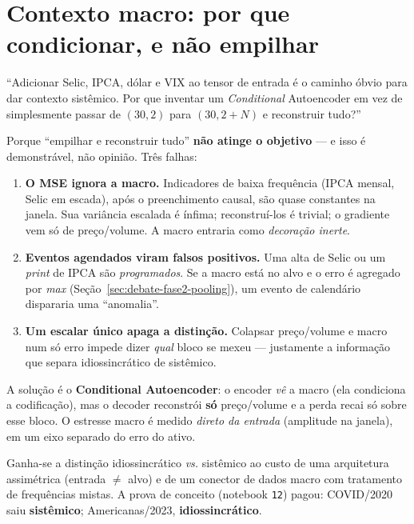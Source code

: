 \section{Contexto macro: por que condicionar, e não empilhar}
\label{sec:debate-macro}

\begin{confronto}
``Adicionar Selic, IPCA, dólar e VIX ao tensor de entrada é o caminho óbvio para dar contexto
sistêmico. Por que inventar um \emph{Conditional} Autoencoder em vez de simplesmente passar de
$(30,2)$ para $(30,2{+}N)$ e reconstruir tudo?''
\end{confronto}

Porque ``empilhar e reconstruir tudo'' \textbf{não atinge o objetivo} --- e isso é demonstrável,
não opinião. Três falhas:

\begin{enumerate}[noitemsep]
  \item \textbf{O MSE ignora a macro.} Indicadores de baixa frequência (IPCA mensal, Selic em
        escada), após o preenchimento causal, são quase constantes na janela. Sua variância escalada
        é ínfima; reconstruí-los é trivial; o gradiente vem só de preço/volume. A macro entraria como
        \emph{decoração inerte}.
  \item \textbf{Eventos agendados viram falsos positivos.} Uma alta de Selic ou um \emph{print} de
        IPCA são \emph{programados}. Se a macro está no alvo e o erro é agregado por \emph{max}
        (Seção~\ref{sec:debate-fase2-pooling}), um evento de calendário dispararia uma ``anomalia''.
  \item \textbf{Um escalar único apaga a distinção.} Colapsar preço/volume e macro num só erro
        impede dizer \emph{qual} bloco se mexeu --- justamente a informação que separa idiossincrático
        de sistêmico.
\end{enumerate}

A solução é o \textbf{Conditional Autoencoder}: o encoder \emph{vê} a macro (ela condiciona a
codificação), mas o decoder reconstrói \textbf{só} preço/volume e a perda recai só sobre esse bloco.
O estresse macro é medido \emph{direto da entrada} (amplitude na janela), em um eixo separado do
erro do ativo.

\begin{tradeoff}
Ganha-se a distinção idiossincrático \emph{vs.} sistêmico ao custo de uma arquitetura assimétrica
(entrada $\ne$ alvo) e de um conector de dados macro com tratamento de frequências mistas. A prova
de conceito (notebook \texttt{12}) pagou: COVID/2020 saiu \textbf{sistêmico}; Americanas/2023,
\textbf{idiossincrático}.
\end{tradeoff}

